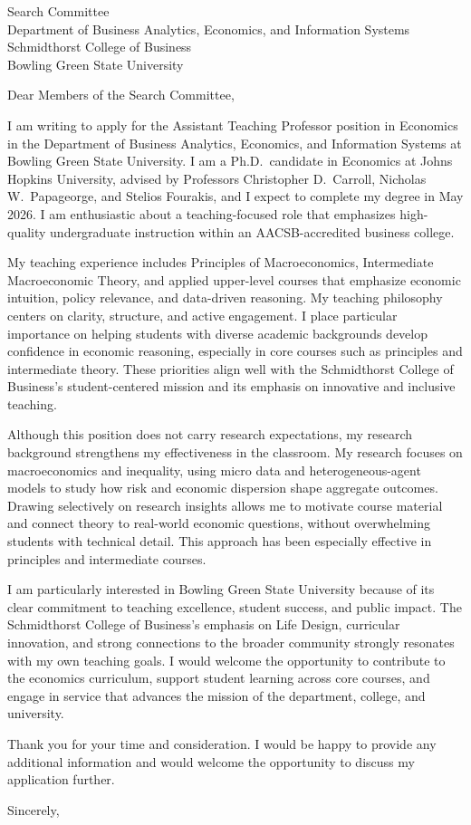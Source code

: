 \documentclass[11pt,letterpaper]{letter}
\begin{document}
\begin{letter}{Search Committee \\
Department of Business Analytics, Economics, and Information Systems \\
Schmidthorst College of Business \\
Bowling Green State University}

\opening{Dear Members of the Search Committee,}

I am writing to apply for the Assistant Teaching Professor position in Economics in the Department of Business Analytics, Economics, and Information Systems at Bowling Green State University. I am a Ph.D.\ candidate in Economics at Johns Hopkins University, advised by Professors Christopher D.\ Carroll, Nicholas W.\ Papageorge, and Stelios Fourakis, and I expect to complete my degree in May 2026. I am enthusiastic about a teaching-focused role that emphasizes high-quality undergraduate instruction within an AACSB-accredited business college.

My teaching experience includes Principles of Macroeconomics, Intermediate Macroeconomic Theory, and applied upper-level courses that emphasize economic intuition, policy relevance, and data-driven reasoning. My teaching philosophy centers on clarity, structure, and active engagement. I place particular importance on helping students with diverse academic backgrounds develop confidence in economic reasoning, especially in core courses such as principles and intermediate theory. These priorities align well with the Schmidthorst College of Business’s student-centered mission and its emphasis on innovative and inclusive teaching.

Although this position does not carry research expectations, my research background strengthens my effectiveness in the classroom. My research focuses on macroeconomics and inequality, using micro data and heterogeneous-agent models to study how risk and economic dispersion shape aggregate outcomes. Drawing selectively on research insights allows me to motivate course material and connect theory to real-world economic questions, without overwhelming students with technical detail. This approach has been especially effective in principles and intermediate courses.

I am particularly interested in Bowling Green State University because of its clear commitment to teaching excellence, student success, and public impact. The Schmidthorst College of Business’s emphasis on Life Design, curricular innovation, and strong connections to the broader community strongly resonates with my own teaching goals. I would welcome the opportunity to contribute to the economics curriculum, support student learning across core courses, and engage in service that advances the mission of the department, college, and university.

Thank you for your time and consideration. I would be happy to provide any additional information and would welcome the opportunity to discuss my application further.

\closing{Sincerely,}

\end{letter}
\end{document}
